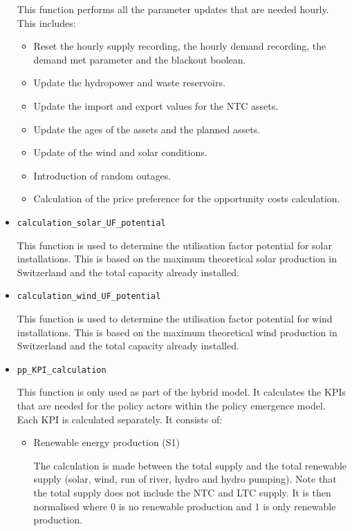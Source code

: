 \begin{itemize}
This function performs all the parameter updates that are needed hourly. This includes:

\begin{itemize}
\item Reset the hourly supply recording, the hourly demand recording, the demand met parameter and the blackout boolean.
\item Update the hydropower and waste reservoirs.
\item Update the import and export values for the NTC assets.
\item Update the ages of the assets and the planned assets.
\item Update of the wind and solar conditions. 
\item Introduction of random outages.
\item Calculation of the price preference for the opportunity costs calculation.
\end{itemize}

\item \texttt{calculation\_solar\_UF\_potential}

This function is used to determine the utilisation factor potential for solar installations. This is based on the maximum theoretical solar production in Switzerland and the total capacity already installed.

\item \texttt{calculation\_wind\_UF\_potential}

This function is used to determine the utilisation factor potential for wind installations. This is based on the maximum theoretical wind production in Switzerland and the total capacity already installed.

\item \texttt{pp\_KPI\_calculation}

This function is only used as part of the hybrid model. It calculates the KPIs that are needed for the policy actors within the policy emergence model. Each KPI is calculated separately. It consists of:

\begin{itemize}
\item Renewable energy production (S1)

The calculation is made between the total supply and the total renewable supply (solar, wind, run of river, hydro and hydro pumping). Note that the total supply does not include the NTC and LTC supply. It is then normalised where 0 is no renewable production and 1 is only renewable production.


\end{itemize}
\end{itemize}
